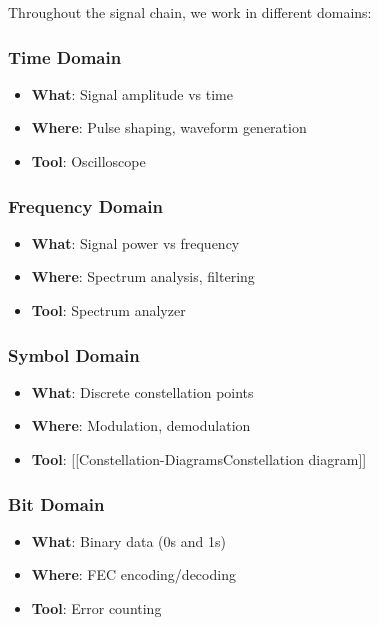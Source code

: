 Throughout the signal chain, we work in different domains:

\subsubsection{Time Domain}\label{time-domain}

\begin{itemize}
\tightlist
\item
  \textbf{What}: Signal amplitude vs time
\item
  \textbf{Where}: Pulse shaping, waveform generation
\item
  \textbf{Tool}: Oscilloscope
\end{itemize}

\subsubsection{Frequency Domain}\label{frequency-domain}

\begin{itemize}
\tightlist
\item
  \textbf{What}: Signal power vs frequency
\item
  \textbf{Where}: Spectrum analysis, filtering
\item
  \textbf{Tool}: Spectrum analyzer
\end{itemize}

\subsubsection{Symbol Domain}\label{symbol-domain}

\begin{itemize}
\tightlist
\item
  \textbf{What}: Discrete constellation points
\item
  \textbf{Where}: Modulation, demodulation
\item
  \textbf{Tool}: {[}{[}Constellation-Diagrams\textbar Constellation
  diagram{]}{]}
\end{itemize}

\subsubsection{Bit Domain}\label{bit-domain}

\begin{itemize}
\tightlist
\item
  \textbf{What}: Binary data (0s and 1s)
\item
  \textbf{Where}: FEC encoding/decoding
\item
  \textbf{Tool}: Error counting
\end{itemize}

